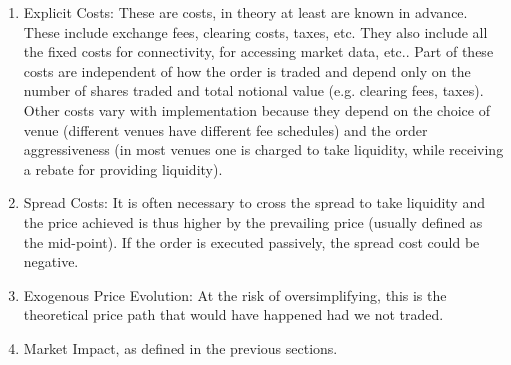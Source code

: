 \begin{enumerate}
\item Explicit Costs: These are costs, in theory at least are known in advance. These include exchange fees, clearing costs, taxes, etc. They also include all the fixed costs for connectivity, for accessing market data, etc.. Part of these costs are independent of how the order is traded and depend only on the number of shares traded and total notional value (e.g. clearing fees, taxes). Other costs vary with implementation because they depend on the choice of venue (different venues have different fee schedules) and the order aggressiveness (in most venues one is charged to take liquidity, while receiving a rebate for providing liquidity).

\item Spread Costs: It is often necessary to cross the spread to take liquidity and the price achieved is thus higher by the prevailing price (usually defined as the mid-point). If the order is executed passively, the spread cost could be negative.




\item Exogenous Price Evolution: At the risk of oversimplifying, this is the theoretical price path that would have happened had we not traded.

\item Market Impact, as defined in the previous sections.  
\end{enumerate}


